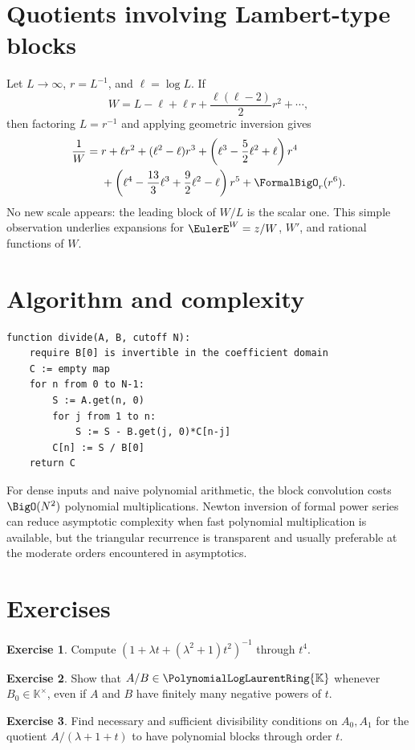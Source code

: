 \documentclass[11pt,openany]{book}
\theoremstyle{definition}
\newtheorem{exercise}{Exercise}[chapter]
\theoremstyle{plain}
\theoremstyle{remark}
\newcommand{\K}{\mathbb{K}}
\newcommand{\Plog}{\PolynomialLogLaurentRing{\K}}
\begin{document}
\section{Quotients involving Lambert-type blocks}
Let \(L\to\infty\), \(r=L^{-1}\), and \(\ell=\log L\). If
\[
 W=L-\ell+\ell r+\frac{\ell(\ell-2)}2r^2+\cdots,
\]
then factoring \(L=r^{-1}\) and applying geometric inversion gives
\begin{align}
 \frac1W={}&r+\ell r^2+(\ell^2-\ell)r^3
 +\left(\ell^3-\frac52\ell^2+\ell\right)r^4\notag\\
 &+\left(\ell^4-\frac{13}{3}\ell^3+\frac92\ell^2-\ell\right)r^5
 +\FormalBigO_r(r^6).
\label{eq:reciprocal-W-preview}
\end{align}
No new scale appears: the leading block of \(W/L\) is the scalar one. This simple observation underlies expansions for \(\EulerE^W=z/W\), \(W'\), and rational functions of \(W\).

\section{Algorithm and complexity}
\begin{lstlisting}[style=pseudo,caption={Triangular block division}]
function divide(A, B, cutoff N):
    require B[0] is invertible in the coefficient domain
    C := empty map
    for n from 0 to N-1:
        S := A.get(n, 0)
        for j from 1 to n:
            S := S - B.get(j, 0)*C[n-j]
        C[n] := S / B[0]
    return C
\end{lstlisting}
For dense inputs and naive polynomial arithmetic, the block convolution costs \(\BigO(N^2)\) polynomial multiplications. Newton inversion of formal power series can reduce asymptotic complexity when fast polynomial multiplication is available, but the triangular recurrence is transparent and usually preferable at the moderate orders encountered in asymptotics.

\section{Exercises}
\begin{exercise}
Compute \((1+\lambda t+(\lambda^2+1)t^2)^{-1}\) through \(t^4\).
\end{exercise}
\begin{exercise}
Show that \(A/B\in\Plog\) whenever \(B_0\in\K^\times\), even if \(A\) and \(B\) have finitely many negative powers of \(t\).
\end{exercise}
\begin{exercise}
Find necessary and sufficient divisibility conditions on \(A_0,A_1\) for the quotient \(A/(\lambda+1+t)\) to have polynomial blocks through order \(t\).
\end{exercise}
\end{document}
